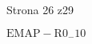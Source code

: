 \documentclass[a4paper,12pt]{article}
\begin{document}
Strona 26 z29

$\mathrm{E}\mathrm{M}\mathrm{A}\mathrm{P}-\mathrm{R}0_{-}10$
\end{document}
